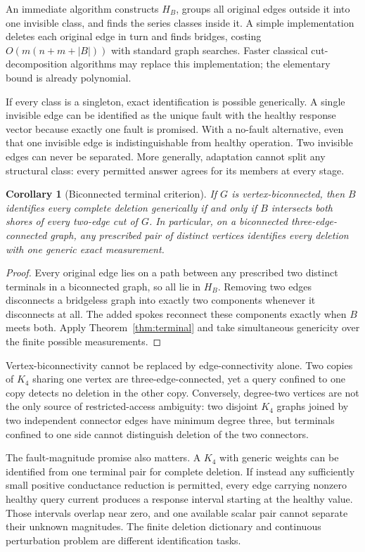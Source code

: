 \documentclass[11pt,letterpaper]{article}
\newtheorem{corollary}[theorem]{Corollary}
\begin{document}
An immediate algorithm constructs $H_B$, groups all original edges outside it into one invisible class, and finds the series classes inside it. A simple implementation deletes each original edge in turn and finds bridges, costing $O(m(n+m+|B|))$ with standard graph searches. Faster classical cut-decomposition algorithms may replace this implementation; the elementary bound is already polynomial.

If every class is a singleton, exact identification is possible generically. A single invisible edge can be identified as the unique fault with the healthy response vector because exactly one fault is promised. With a no-fault alternative, even that one invisible edge is indistinguishable from healthy operation. Two invisible edges can never be separated. More generally, adaptation cannot split any structural class: every permitted answer agrees for its members at every stage.

\begin{corollary}[Biconnected terminal criterion]\label{cor:terminal}
If $G$ is vertex-biconnected, then $B$ identifies every complete deletion generically if and only if $B$ intersects both shores of every two-edge cut of $G$. In particular, on a biconnected three-edge-connected graph, any prescribed pair of distinct vertices identifies every deletion with one generic exact measurement.
\end{corollary}
\begin{proof}
Every original edge lies on a path between any prescribed two distinct terminals in a biconnected graph, so all lie in $H_B$. Removing two edges disconnects a bridgeless graph into exactly two components whenever it disconnects at all. The added spokes reconnect these components exactly when $B$ meets both. Apply Theorem~\ref{thm:terminal} and take simultaneous genericity over the finite possible measurements.
\end{proof}

Vertex-biconnectivity cannot be replaced by edge-connectivity alone. Two copies of $K_4$ sharing one vertex are three-edge-connected, yet a query confined to one copy detects no deletion in the other copy. Conversely, degree-two vertices are not the only source of restricted-access ambiguity: two disjoint $K_4$ graphs joined by two independent connector edges have minimum degree three, but terminals confined to one side cannot distinguish deletion of the two connectors.

The fault-magnitude promise also matters. A $K_4$ with generic weights can be identified from one terminal pair for complete deletion. If instead any sufficiently small positive conductance reduction is permitted, every edge carrying nonzero healthy query current produces a response interval starting at the healthy value. Those intervals overlap near zero, and one available scalar pair cannot separate their unknown magnitudes. The finite deletion dictionary and continuous perturbation problem are different identification tasks.
\end{document}
